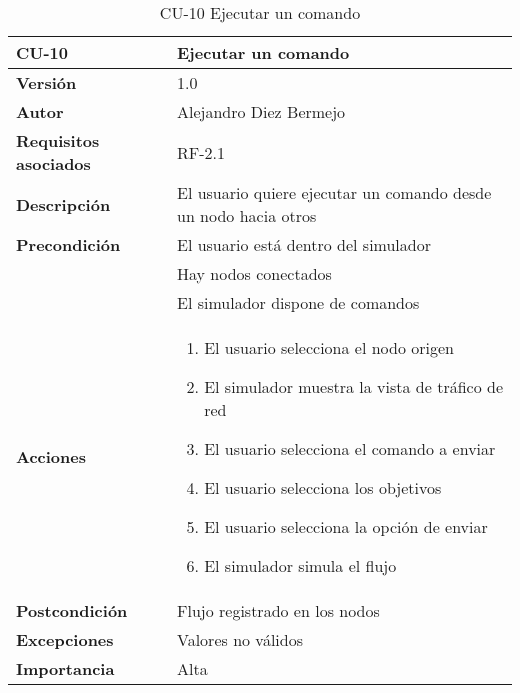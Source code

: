 \begin{table}[p]
	\centering
	\begin{tabularx}{\linewidth}{ p{} p{} }
		\toprule
		\textbf{CU-10}    & \textbf{Ejecutar un comando}\\
		\toprule
		\textbf{Versión}              & 1.0    \\
		\textbf{Autor}                & Alejandro Diez Bermejo \\
		\textbf{Requisitos asociados} & RF-2.1 \\
		\textbf{Descripción}          & El usuario quiere ejecutar un comando desde un nodo hacia otros \\
        \textbf{Precondición}         & El usuario está dentro del simulador \\
                                      & Hay nodos conectados \\
                                      & El simulador dispone de comandos \\
		\textbf{Acciones}             &
		\begin{enumerate}
			\def\labelenumi{\arabic{enumi}.}
			\tightlist
			\item El usuario selecciona el nodo origen
            \item El simulador muestra la vista de tráfico de red
            \item El usuario selecciona el comando a enviar
            \item El usuario selecciona los objetivos
            \item El usuario selecciona la opción de enviar
            \item El simulador simula el flujo
		\end{enumerate}\\
		\textbf{Postcondición}        & Flujo registrado en los nodos \\
		\textbf{Excepciones}          & Valores no válidos \\
		\textbf{Importancia}          & Alta \\
		\bottomrule
	\end{tabularx}
	\caption{CU-10 Ejecutar un comando}
\end{table}

